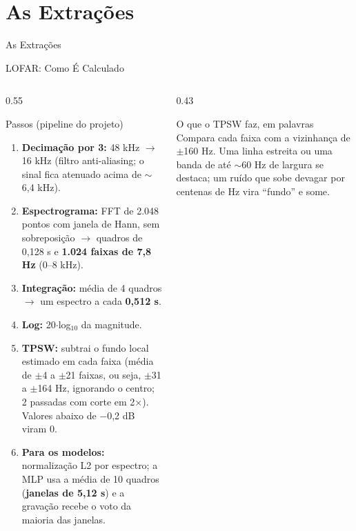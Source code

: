 \documentclass[aspectratio=169]{beamer}
\begin{document}
\section{As Extrações}

\begin{frame}
    \centering
    \huge As Extrações
\end{frame}

\begin{frame}{LOFAR: Como É Calculado}
    \footnotesize
    \begin{columns}[T]
        \begin{column}{0.55\textwidth}
            \begin{block}{\small Passos (pipeline do projeto)}
                \scriptsize
                \begin{enumerate}
                    \setlength{\itemsep}{1pt}
                    \item \textbf{Decimação por 3:} 48 kHz $\to$ 16 kHz (filtro anti-aliasing; o sinal fica atenuado acima de $\sim$6,4 kHz).
                    \item \textbf{Espectrograma:} FFT de 2.048 pontos com janela de Hann, sem sobreposição $\to$ quadros de 0,128 s e \textbf{1.024 faixas de 7,8 Hz} (0--8 kHz).
                    \item \textbf{Integração:} média de 4 quadros $\to$ um espectro a cada \textbf{0,512 s}.
                    \item \textbf{Log:} 20$\cdot$log$_{10}$ da magnitude.
                    \item \textbf{TPSW:} subtrai o fundo local estimado em cada faixa (média de $\pm$4 a $\pm$21 faixas, ou seja, $\pm$31 a $\pm$164 Hz, ignorando o centro; 2 passadas com corte em 2$\times$). Valores abaixo de $-$0,2 dB viram 0.
                    \item \textbf{Para os modelos:} normalização L2 por espectro; a MLP usa a média de 10 quadros (\textbf{janelas de 5,12 s}) e a gravação recebe o voto da maioria das janelas.
                \end{enumerate}
            \end{block}
        \end{column}
        \begin{column}{0.43\textwidth}
            \begin{block}{\small O que o TPSW faz, em palavras}
                \scriptsize
                Compara cada faixa com a vizinhança de $\pm$160 Hz. Uma linha estreita ou uma banda de até $\sim$60 Hz de largura se destaca; um ruído que sobe devagar por centenas de Hz vira ``fundo'' e some.

\end{block}
\end{column}
\end{columns}
\end{frame}
\end{document}
